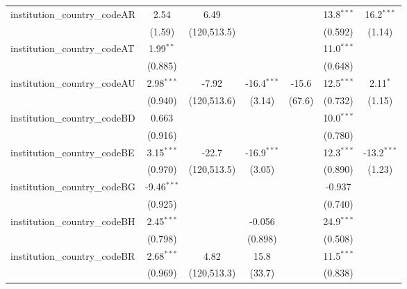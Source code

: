 \begin{tabular}{lcccccc}
   institution\_country\_codeAR          & 2.54           & 6.49          &               &            & 13.8$^{***}$  & 16.2$^{***}$\\   
                                         & (1.59)         & (120,513.5)   &               &            & (0.592)       & (1.14)\\   
   institution\_country\_codeAT          & 1.99$^{**}$    &               &               &            & 11.0$^{***}$  &   \\   
                                         & (0.885)        &               &               &            & (0.648)       &   \\   
   institution\_country\_codeAU          & 2.98$^{***}$   & -7.92         & -16.4$^{***}$ & -15.6      & 12.5$^{***}$  & 2.11$^{*}$\\   
                                         & (0.940)        & (120,513.6)   & (3.14)        & (67.6)     & (0.732)       & (1.15)\\   
   institution\_country\_codeBD          & 0.663          &               &               &            & 10.0$^{***}$  &   \\   
                                         & (0.916)        &               &               &            & (0.780)       &   \\   
   institution\_country\_codeBE          & 3.15$^{***}$   & -22.7         & -16.9$^{***}$ &            & 12.3$^{***}$  & -13.2$^{***}$\\   
                                         & (0.970)        & (120,513.5)   & (3.05)        &            & (0.890)       & (1.23)\\   
   institution\_country\_codeBG          & -9.46$^{***}$  &               &               &            & -0.937        &   \\   
                                         & (0.925)        &               &               &            & (0.740)       &   \\   
   institution\_country\_codeBH          & 2.45$^{***}$   &               & -0.056        &            & 24.9$^{***}$  &   \\   
                                         & (0.798)        &               & (0.898)       &            & (0.508)       &   \\   
   institution\_country\_codeBR          & 2.68$^{***}$   & 4.82          & 15.8          &            & 11.5$^{***}$  &   \\   
                                         & (0.969)        & (120,513.3)   & (33.7)        &            & (0.838)       &   \\   

\end{tabular}
